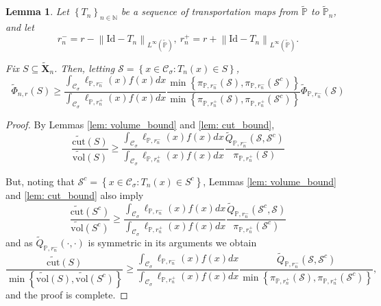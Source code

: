 \documentclass{article}
\newcommand{\norm}[1]{\left\lVert#1\right\rVert}
\newcommand{\set}[1]{\left\{#1\right\}}
\newcommand{\seq}[1]{\set{#1}_{n \in \N}}
\newcommand{\N}{\mathbb{N}}
\newcommand{\Xbf}{\mathbf{X}}
\newcommand{\Cset}{\mathcal{C}}
\newcommand{\Sset}{\mathcal{S}}
\newcommand{\Csig}{\Cset_{\sigma}}
\newcommand{\Pbb}{\mathbb{P}}
\newcommand{\1}{\mathbf{1}}
\newcommand{\cut}{\mathrm{cut}}
\newcommand{\vol}{\mathrm{vol}}
\theoremstyle{alden}
\theoremstyle{aldenthm}
\newtheorem{lemma}{Lemma}
\theoremstyle{remark}
\begin{document}
\begin{lemma}
	\label{lem: graph_to_continuous_conductance}
	Let $\seq{T_n}$ be a sequence of transportation maps from $\widetilde{\Pbb}$ to $\widetilde{\Pbb}_n$, and let
	\begin{equation*}
	r_n^- = r - \norm{\mathrm{Id} - T_n}_{L^{\infty}(\widetilde{\Pbb})},~ r_n^+ = r + \norm{\mathrm{Id} - T_n}_{L^{\infty}(\widetilde{\Pbb})}.
	\end{equation*}
	
	Fix $S \subseteq \widetilde{\Xbf}_n$. Then, letting $\Sset = \set{x \in \Csig: T_n(x) \in S}$,
	\begin{equation}
	\label{eqn: graph_to_continuous_conductance}
	\widetilde{\Phi}_{n,r}(S) \geq \frac{\int_{\Csig} \ell_{\Pbb,r_n^-}(x) f(x) dx}{\int_{\Csig} \ell_{\Pbb,r_n^+}(x) f(x) dx}  \frac{\min \set{\pi_{\Pbb,r_n^-}(\Sset), \pi_{\Pbb,r_n^-}(\Sset^c)} }{\min \set{\pi_{\Pbb,r_n^+}(\Sset), \pi_{\Pbb,r_n^+}(\Sset^c)} } \widetilde{\Phi}_{\Pbb,r_n^{-}}(\Sset)
	\end{equation}
\end{lemma}
\begin{proof}
	
	By Lemmas \ref{lem: volume_bound} and \ref{lem: cut_bound},
	\begin{equation*}
	\frac{\widetilde{\cut}(S)}{\widetilde{\vol}(S)} \geq \frac{\int_{\Csig} \ell_{\Pbb,r_n^-}(x) f(x) dx}{\int_{\Csig} \ell_{\Pbb,r_n^+}(x) f(x) dx} \frac{\widetilde{Q}_{\Pbb,r_n^-}(\Sset, \Sset^c)}{\pi_{\Pbb,r_n^+}(\Sset)}
	\end{equation*}
	
	But, noting that $\Sset^c = \set{x \in \Csig: T_n(x) \in S^c}$, Lemmas \ref{lem: volume_bound} and \ref{lem: cut_bound} also imply
	\begin{equation*}
	\frac{\widetilde{\cut}(S^c)}{\widetilde{\vol}(S^c)} \geq \frac{\int_{\Csig} \ell_{\Pbb,r_n^-}(x) f(x) dx}{\int_{\Csig} \ell_{\Pbb,r_n^+}(x) f(x) dx} \frac{\widetilde{Q}_{\Pbb,r_n^-}(\Sset^c, \Sset)}{\pi_{\Pbb,r_n^+}(\Sset^c)}
	\end{equation*}
	and as $\widetilde{Q}_{\Pbb,r_n^-}(\cdot, \cdot)$ is symmetric in its arguments we obtain
	\begin{equation*}
	\frac{\widetilde{\cut}(S)}{\min\set{\widetilde{\vol}(S), \widetilde{\vol}(S^c)}} \geq \frac{\int_{\Csig} \ell_{\Pbb,r_n^-}(x) f(x) dx}{\int_{\Csig} \ell_{\Pbb,r_n^+}(x) f(x) dx} \frac{\widetilde{Q}_{\Pbb,r_n^-}(\Sset, \Sset^c)}{\min \set{\pi_{\Pbb,r_n^+}(\Sset), \pi_{\Pbb,r_n^+}(\Sset^c)} },
	\end{equation*}
	and the proof is complete.
\end{proof}
\end{document}
